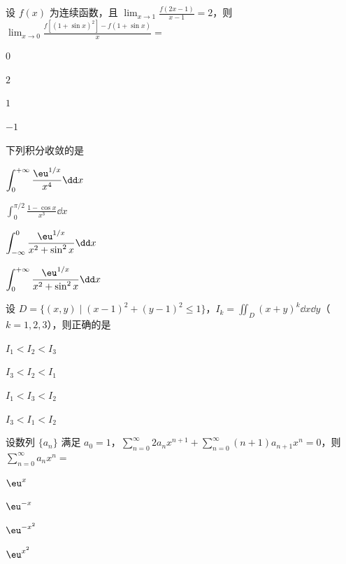 
\begin{question}[index=1]
设 $f(x)$ 为连续函数，且 $\displaystyle\lim_{x\to1}\frac{f(2x-1)}{x-1}=2$，则 $\displaystyle\lim_{x\to0}\frac{f[(1+\sin x)^2]-f(1+\sin x)}x=$
\begin{choices}[columns=4]
\item $0$
\item $2$
\item $1$
\item $-1$
\end{choices}
\end{question}
\QuestionBreak

\begin{question}[index=2]
下列积分收敛的是
\begin{choices}[columns=2]
\item $\displaystyle\int_0^{+\infty}\frac{\eu^{1/x}}{x^4}\dd x$
\item $\displaystyle\int_0^{\pi/2}\frac{1-\cos x}{x^3}\dd x$
\item $\displaystyle\int_{-\infty}^0\frac{\eu^{1/x}}{x^2+\sin^2x}\dd x$
\item $\displaystyle\int_0^{+\infty}\frac{\eu^{1/x}}{x^2+\sin^2x}\dd x$
\end{choices}
\end{question}
\QuestionBreak

\begin{question}[index=3]
设 $D=\{(x,y)\mid(x-1)^2+(y-1)^2\le1\}$，$\displaystyle I_k=\iint_D(x+y)^k\dd x\dd y$（$k=1,2,3$），则正确的是
\begin{choices}[columns=4]
\item $I_1<I_2<I_3$
\item $I_3<I_2<I_1$
\item $I_1<I_3<I_2$
\item $I_3<I_1<I_2$
\end{choices}
\end{question}
\QuestionBreak

\begin{question}[index=4]
设数列 $\{a_n\}$ 满足 $a_0=1$，$\displaystyle\sum_{n=0}^\infty2a_nx^{n+1}+\sum_{n=0}^\infty(n+1)a_{n+1}x^n=0$，则 $\displaystyle\sum_{n=0}^\infty a_nx^n=$
\begin{choices}[columns=4]
\item $\eu^x$
\item $\eu^{-x}$
\item $\eu^{-x^2}$
\item $\eu^{x^2}$
\end{choices}
\end{question}
\QuestionBreak

